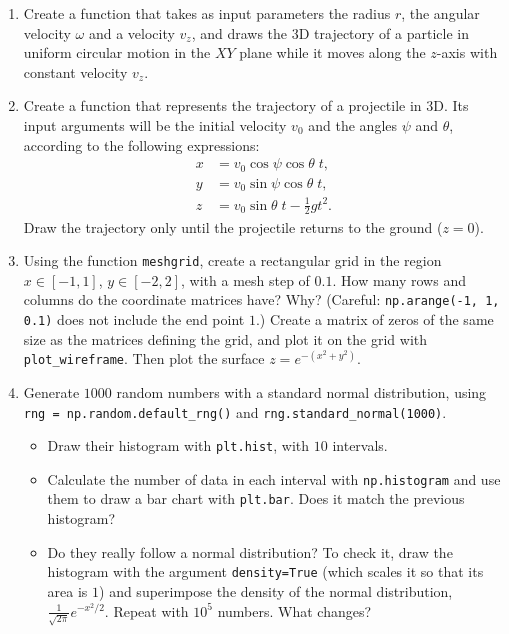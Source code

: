 \begin{enumerate}
\item Create a function that takes as input parameters the radius $r$, the angular velocity $\omega$ and a velocity $v_z$, and draws the 3D trajectory of a particle in uniform circular motion in the $XY$ plane while it moves along the $z$-axis with constant velocity $v_z$.

\item Create a function that represents the trajectory of a projectile in 3D. Its input arguments will be the initial velocity $v_0$ and the angles $\psi$ and $\theta$, according to the following expressions:
\begin{align*}
    x&=v_0 \cos\psi \cos\theta \; t, \\
    y&=v_0 \sin\psi \cos\theta \; t,  \\
    z&=v_0 \sin\theta \; t- \frac{1}{2} g t^2.
\end{align*}
Draw the trajectory only until the projectile returns to the ground ($z=0$).

\item Using the function \texttt{meshgrid}, create a rectangular grid in the region $x \in [-1, 1]$, $y \in [-2, 2]$, with a mesh step of $0.1$. How many rows and columns do the coordinate matrices have? Why? (Careful: \texttt{np.arange(-1, 1, 0.1)} does not include the end point $1$.) Create a matrix of zeros of the same size as the matrices defining the grid, and plot it on the grid with \texttt{plot\_wireframe}. Then plot the surface $z = e^{-(x^2+y^2)}$.

\item Generate $1000$ random numbers with a standard normal distribution, using \texttt{rng = np.random.default\_rng()} and \texttt{rng.standard\_normal(1000)}.
\begin{itemize}
    \item Draw their histogram with \texttt{plt.hist}, with $10$ intervals.
    \item Calculate the number of data in each interval with \texttt{np.histogram} and use them to draw a bar chart with \texttt{plt.bar}. Does it match the previous histogram?
    \item Do they really follow a normal distribution? To check it, draw the histogram with the argument \texttt{density=True} (which scales it so that its area is $1$) and superimpose the density of the normal distribution, $\frac{1}{\sqrt{2\pi}}e^{-x^2/2}$. Repeat with $10^5$ numbers. What changes?
\end{itemize}


\end{enumerate}
